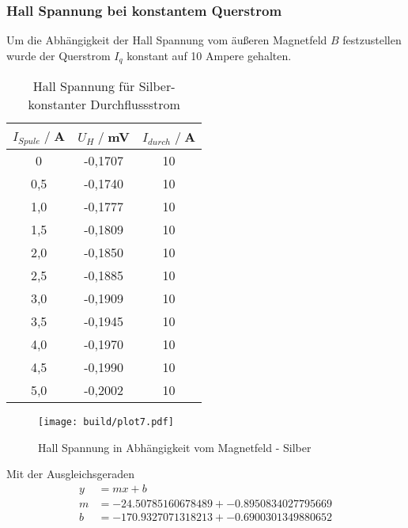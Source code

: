 \subsubsection{Hall Spannung bei konstantem Querstrom}
Um die Abhängigkeit der Hall Spannung vom äußeren Magnetfeld $B$ festzustellen wurde der Querstrom $I_q$ konstant auf 10 Ampere gehalten.
\begin{table}[H]
    \centering
    \begin{tabular}{c c c}
        \toprule
        $I_{Spule} \;/\;$A & $U_H\;/\;$mV & $I_{durch} \;/\;$A\\
        \midrule
            0                   &-0,1707&             10\\
            0,5                 &-0,1740&             10\\
            1,0                 &-0,1777&             10\\
            1,5                 &-0,1809&             10\\
            2,0                 &-0,1850&             10\\
            2,5                 &-0,1885&             10\\
            3,0                 &-0,1909&             10\\
            3,5                 &-0,1945&             10\\
            4,0                 &-0,1970&             10\\
            4,5                 &-0,1990&             10\\
            5,0                 &-0,2002&             10\\
       \bottomrule
    \end{tabular}
    \caption{Hall Spannung für Silber- konstanter Durchflussstrom}
    \label{tab:Ag_I}
\end{table}
\begin{figure}[H]
    \centering
    \texttt{[image: build/plot7.pdf]}
    \caption{Hall Spannung in Abhängigkeit vom Magnetfeld - Silber}
    \label{fig:Ag_B}
\end{figure}
Mit der Ausgleichsgeraden
\begin{align*}
    y &= mx + b\\
    m &= -24.50785160678489 +- 0.8950834027795669\\
    b &= -170.9327071318213 +- 0.6900301349880652\\ 
\end{align*}

